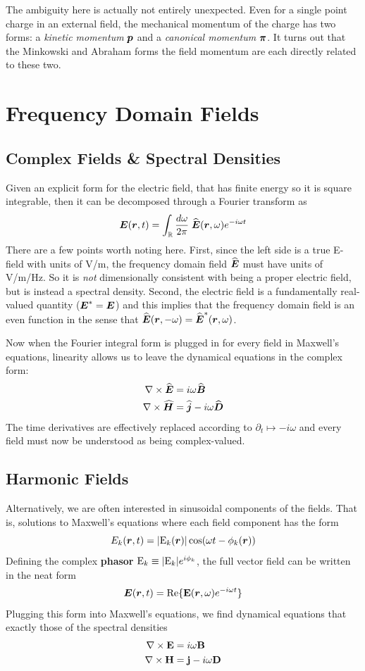 \documentclass[twocolumn]{gwclass}
\newcommand{\R}{\mathbb{R}}
\newcommand{\bt}[1]{\text{\textbf{#1}}}
\begin{document}
The ambiguity here is actually not entirely unexpected. Even for a single point charge in an external field, the mechanical momentum of the charge has two forms: a \emph{kinetic momentum} $\boldsymbol{p}$ and a \emph{canonical momentum} $\boldsymbol{\pi}$. It turns out that the Minkowski and Abraham forms the field momentum are each directly related to these two.


	\section{Frequency Domain Fields}	
	\subsection{Complex Fields \& Spectral Densities}
	Given an explicit form for the electric field, that has finite energy so it is square integrable, then it can be decomposed through a Fourier transform as
	$$ \*E(\*r,t) = \int_\R \frac{d\omega}{2\pi}\;\widehat{\*E}(\*r,\omega)e^{-i\omega t} $$
	There are a few points worth noting here. First, since the left side is a true E-field with units of V/m, the frequency domain field $\widehat{\boldsymbol{E}}$ must have units of V/m/Hz. So it is \emph{not} dimensionally consistent with being a proper electric field, but is instead a spectral density. Second, the electric field is a fundamentally real-valued quantity ($\boldsymbol{E}^*=\boldsymbol{E}$) and this implies that the frequency domain field is an even function in the sense that $ \widehat{\boldsymbol{E}}(\boldsymbol{r},-\omega) = \widehat{\boldsymbol{E}}^*(\boldsymbol{r},\omega)$. 
	
	Now when the Fourier integral form is plugged in for every field in Maxwell's equations, linearity allows us to leave the dynamical equations in the complex form:
	\begin{align*}
		\nabla\times \widehat{\boldsymbol{E}} &= i\omega\widehat{\boldsymbol{B}}	 \\
		\nabla\times\boldsymbol{\widehat{H}} &= \widehat{\boldsymbol{j}} - i\omega\widehat{\boldsymbol{D}}
	\end{align*}
	The time derivatives are effectively replaced according to $\partial_t \mapsto -i\omega$ and every field must now be understood as being complex-valued.
	
	\subsection{Harmonic Fields}
	Alternatively, we are often interested in sinusoidal components of the fields. That is, solutions to Maxwell's equations where each field component has the form
	$$ E_k(\boldsymbol{r},t) = |\text{\normalfont{E}}_k(\boldsymbol{r})|\cos(\omega t - \phi_k(\boldsymbol{r})) $$
	Defining the complex \textbf{phasor} $\text{\normalfont{E}}_k\equiv |\text{\normalfont{E}}_k|e^{i\phi_k}$, the full vector field can be written in the neat form
	$$ \*E(\*r,t) = \t{Re}\{ \bt{E}(\*r,\omega)e^{-i\omega t} \} $$
	Plugging this form into Maxwell's equations, we find dynamical equations that exactly those of the spectral densities
	\begin{align*}
		\nabla\times \bt{E} &= i\omega\bt{B}	 \\
		\nabla\times\bt{H} &= \bt{j} - i\omega\bt{D}
	\end{align*}
	
\end{document}
